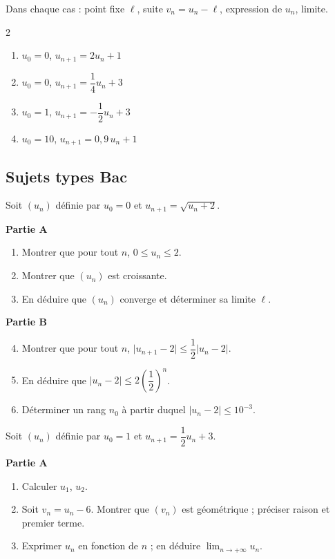 Dans chaque cas : point fixe $\ell$, suite $v_n=u_n-\ell$, expression de
$u_n$, limite.
\begin{multicols}{2}
\begin{enumerate}
	\item $u_0=0$, $u_{n+1}=2u_n+1$
	\item $u_0=0$, $u_{n+1}=\dfrac14 u_n+3$
	\item $u_0=1$, $u_{n+1}=-\dfrac12 u_n+3$
	\item $u_0=10$, $u_{n+1}=0{,}9\,u_n+1$
\end{enumerate}
\end{multicols}

\subsection{Sujets types Bac}

Soit $(u_n)$ définie par $u_0=0$ et $u_{n+1}=\sqrt{u_n+2}$.

\textbf{Partie A}
\begin{enumerate}
	\item Montrer que pour tout $n$, $0\leq u_n\leq 2$.
	\item Montrer que $(u_n)$ est croissante.
	\item En déduire que $(u_n)$ converge et déterminer sa limite $\ell$.
\end{enumerate}

\textbf{Partie B}
\begin{enumerate}
	\setcounter{enumi}{3}
	\item Montrer que pour tout $n$,
	$\bigl|u_{n+1}-2\bigr|\leq\dfrac12\bigl|u_n-2\bigr|$.
	\item En déduire que $\bigl|u_n-2\bigr|\leq 2\left(\dfrac12\right)^{n}$.
	\item Déterminer un rang $n_0$ à partir duquel $\bigl|u_n-2\bigr|\leq 10^{-3}$.
\end{enumerate}

Soit $(u_n)$ définie par $u_0=1$ et $u_{n+1}=\dfrac12 u_n+3$.

\textbf{Partie A}
\begin{enumerate}
	\item Calculer $u_1$, $u_2$.
	\item Soit $v_n=u_n-6$. Montrer que $(v_n)$ est géométrique ; préciser
	raison et premier terme.
	\item Exprimer $u_n$ en fonction de $n$ ; en déduire
	$\displaystyle\lim_{n\to+\infty}u_n$.
\end{enumerate}

